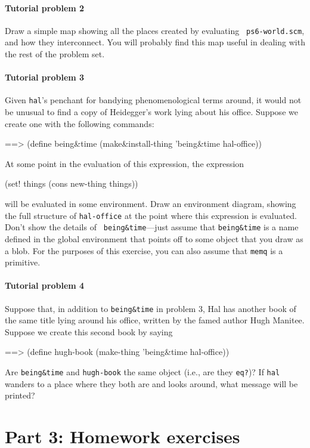 \paragraph{Tutorial problem 2}

Draw a simple map showing all the places created by evaluating {\tt
ps6-world.scm}, and how they interconnect.  You will probably find
this map useful in dealing with the rest of the problem set.

\paragraph{Tutorial problem 3}

Given {\tt hal}'s penchant for bandying phenomenological terms around, it
would not be unusual to find a copy of Heidegger's work lying about
his office.  Suppose we create one with the following commands:

\beginlisp
==> (define being\&time (make\&install-thing 'being\&time hal-office))
\endlisp

At some point in the evaluation of this expression, the expression

\beginlisp
(set! things (cons new-thing things))
\endlisp

will be evaluated in some environment.  Draw an environment diagram,
showing the full structure of {\tt hal-office} at the point where
this expression is evaluated.  Don't show the details of {\tt
being\&time}---just assume that {\tt being\&time} is a name defined in
the global environment that points off to some object that you draw as
a blob. For the purposes of this exercise, you can also assume that
{\tt memq} is a primitive.  

\paragraph{Tutorial problem 4}

Suppose that, in addition to {\tt being\&time} in problem 3, Hal has
another book of the same title lying around his office, written by the
famed author Hugh Manitee.  Suppose we create this second book by saying

\beginlisp
==> (define hugh-book (make-thing 'being\&time hal-office))
\endlisp

Are {\tt being\&time} and {\tt hugh-book} the same object (i.e.,
are they {\tt eq?})?  If {\tt hal} wanders to a place where they both
are and looks around, what message will be printed?

\section{Part 3: Homework exercises}

